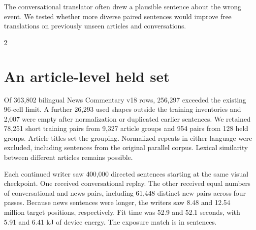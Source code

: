 \newpage
{}
\noindent The conversational translator often drew a plausible sentence about the wrong event. We tested whether more diverse paired sentences would improve free translations on previously unseen articles and conversations.
\begin{multicols}{2}
\section*{An article-level held set}
Of 363,802 bilingual News Commentary v18 rows, 256,297 exceeded the existing 96-cell limit. A further 26,293 used shapes outside the training inventories and 2,007 were empty after normalization or duplicated earlier sentences. We retained 78,251 short training pairs from 9,327 article groups and 954 pairs from 128 held groups. Article titles set the grouping. Normalized repeats in either language were excluded, including sentences from the original parallel corpus. Lexical similarity between different articles remains possible.
\par Each continued writer saw 400,000 directed sentences starting at the same visual checkpoint. One received conversational replay. The other received equal numbers of conversational and news pairs, including 61,448 distinct new pairs across four passes. Because news sentences were longer, the writers saw 8.48 and 12.54 million target positions, respectively. Fit time was 52.9 and 52.1 seconds, with 5.91 and 6.41 kJ of device energy. The exposure match is in sentences.

\end{multicols}
